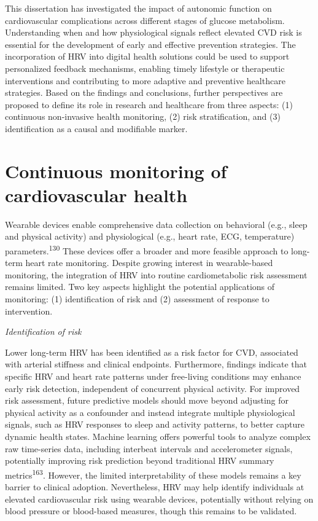\documentclass[
  a4paper,
  headsepline=true,
  open=any]{scrbook}
\begin{document}
This dissertation has investigated the impact of autonomic function on
cardiovascular complications across different stages of glucose
metabolism. Understanding when and how physiological signals reflect
elevated CVD risk is essential for the development of early and
effective prevention strategies. The incorporation of HRV into digital
health solutions could be used to support personalized feedback
mechanisms, enabling timely lifestyle or therapeutic interventions and
contributing to more adaptive and preventive healthcare strategies.
Based on the findings and conclusions, further perspectives are proposed
to define its role in research and healthcare from three aspects: (1)
continuous non-invasive health monitoring, (2) risk stratification, and
(3) identification as a causal and modifiable marker.

\hypertarget{continuous-monitoring-of-cardiovascular-health}{%
\section{Continuous monitoring of cardiovascular
health}\label{continuous-monitoring-of-cardiovascular-health}}

Wearable devices enable comprehensive data collection on behavioral
(e.g., sleep and physical activity) and physiological (e.g., heart rate,
ECG, temperature) parameters.\textsuperscript{130} These devices offer a
broader and more feasible approach to long-term heart rate monitoring.
Despite growing interest in wearable-based monitoring, the integration
of HRV into routine cardiometabolic risk assessment remains limited. Two
key aspects highlight the potential applications of monitoring: (1)
identification of risk and (2) assessment of response to intervention.

\emph{Identification of risk}

Lower long-term HRV has been identified as a risk factor for CVD,
associated with arterial stiffness and clinical endpoints. Furthermore,
findings indicate that specific HRV and heart rate patterns under
free-living conditions may enhance early risk detection, independent of
concurrent physical activity. For improved risk assessment, future
predictive models should move beyond adjusting for physical activity as
a confounder and instead integrate multiple physiological signals, such
as HRV responses to sleep and activity patterns, to better capture
dynamic health states. Machine learning offers powerful tools to analyze
complex raw time-series data, including interbeat intervals and
accelerometer signals, potentially improving risk prediction beyond
traditional HRV summary metrics\textsuperscript{163}. However, the
limited interpretability of these models remains a key barrier to
clinical adoption. Nevertheless, HRV may help identify individuals at
elevated cardiovascular risk using wearable devices, potentially without
relying on blood pressure or blood-based measures, though this remains
to be validated.
\end{document}
